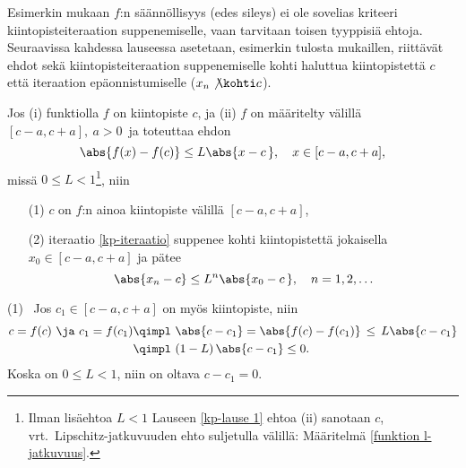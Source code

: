Esimerkin mukaan $f$:n säännöllisyys (edes sileys) ei ole sovelias kriteeri
kiintopisteiteraation suppenemiselle, vaan tarvitaan toisen tyyppisiä ehtoja. Seuraavissa
kahdessa lauseessa asetetaan, esimerkin tulosta mukaillen, riittävät ehdot sekä
kiintopisteiteraation suppenemiselle kohti haluttua kiintopistettä $c$ että iteraation
epäonnistumiselle ($ x_n \not\kohti c$).
\begin{Lause} \label{kp-lause 1} Jos (i) funktiolla $f$ on kiintopiste $c$, ja (ii) $f$ on 
määritelty välillä $[c-a,c+a],\ a>0\,$  ja toteuttaa ehdon
\[
\abs{f(x)-f(c)} \le L\abs{x-c\,}, \quad x \in [c-a,c+a],
\]
missä $0 \le L<1$\footnote[2]{Ilman lisäehtoa $L<1$ Lauseen \ref{kp-lause 1} ehtoa (ii)
sanotaan  $c$, vrt.\ Lipschitz-jatkuvuuden ehto suljetulla
välillä: Määritelmä \ref{funktion l-jatkuvuus}. }, niin
\begin{itemize}
\item[(1)] $c$ on $f$:n ainoa kiintopiste välillä $[c-a,c+a]$,
\item[(2)] iteraatio \eqref{kp-iteraatio} suppenee kohti kiintopistettä jokaisella 
$x_0\in [c-a,c+a]$ ja pätee
\[ 
\abs{x_n-c} \le L^n\abs{x_0-c\,}, \quad n=1,2,\ldots 
\]
\end{itemize}
\end{Lause}
\tod (1) \ Jos $c_1\in [c-a,c+a]$ on myös kiintopiste, niin
\begin{align*}
c=f(c)\ \ja\ c_1=f(c_1) &\qimpl\ \abs{c-c_1}=\abs{f(c)-f(c_1)} \,\le\, L\abs{c-c_1} \\
                        &\qimpl\  (1-L)\,\abs{c-c_1} \le 0.
\end{align*}
Koska on $0 \le L < 1$, niin on oltava $c-c_1=0$.

